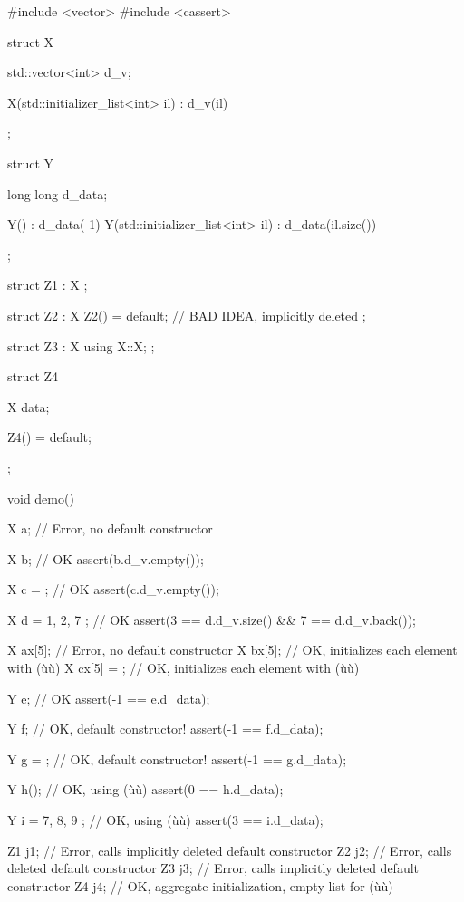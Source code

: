\begin{emcppslisting}
#include <vector>
#include <cassert>

struct X
{
    std::vector<int> d_v;

    X(std::initializer_list<int> il) : d_v(il) {}
};

struct Y
{
    long long d_data;

    Y() : d_data(-1) {}
    Y(std::initializer_list<int> il) : d_data(il.size()) {}
};

struct Z1 : X { };

struct Z2 : X
{
    Z2() = default;       // BAD IDEA, implicitly deleted
};

struct Z3 : X
{
    using X::X;
};

struct Z4
{
    X data;

    Z4() = default;
};

void demo()
{
    X a;                  // Error, no default constructor

    X b{};                // OK
    assert(b.d_v.empty());

    X c = {};             // OK
    assert(c.d_v.empty());

    X d = { 1, 2, 7 };    // OK
    assert(3 == d.d_v.size() && 7 == d.d_v.back());

    X ax[5];              // Error, no default constructor
    X bx[5]{};            // OK, initializes each element with (ù{\codeincomments{\{\}}}ù)
    X cx[5] = {};         // OK, initializes each element with (ù{\codeincomments{\{\}}}ù)

    Y e;                  // OK
    assert(-1 == e.d_data);

    Y f{};                // OK, default constructor!
    assert(-1 == f.d_data);

    Y g = {};             // OK, default constructor!
    assert(-1 == g.d_data);

    Y h({});              // OK, using (ù{}ù)
    assert(0  == h.d_data);

    Y i = { 7, 8, 9 };    // OK, using (ù{}ù)
    assert(3  == i.d_data);

    Z1 j1{};       // Error, calls implicitly deleted default constructor
    Z2 j2{};       // Error, calls deleted default constructor
    Z3 j3{};       // Error, calls implicitly deleted default constructor
    Z4 j4{};       // OK, aggregate initialization, empty list for (ù{}ù)

}
\end{emcppslisting}
